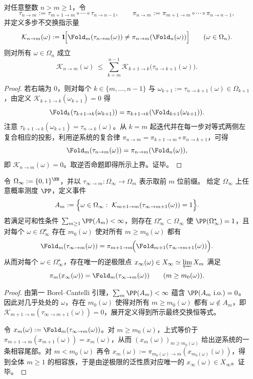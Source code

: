 \begin{lemma}[多步曲率由单步曲率事件支配]\label{lem:pom-multistep-curvature-dominated}
对任意整数 $n>m\ge 1$，令
\[
\tau_{n\to m}:=\tau_{m+1\to m}\circ\cdots\circ\tau_{n\to n-1},
\qquad
\pi_{n\to m}:=\pi_{m+1\to m}\circ\cdots\circ\pi_{n\to n-1},
\]
并定义多步不交换指示量
\[
\mathcal K_{n\to m}(\omega):=\mathbf 1\!\Big[\Fold_m(\tau_{n\to m}(\omega))\neq \pi_{n\to m}(\Fold_n(\omega))\Big]\qquad(\omega\in\Omega_n).
\]
则对所有 $\omega\in\Omega_n$ 成立
\[
\mathcal K_{n\to m}(\omega)\ \le\ \sum_{k=m}^{n-1}\mathcal K_{k+1\to k}\!\bigl(\tau_{n\to k+1}(\omega)\bigr).
\]
\end{lemma}
\begin{proof}
若右端为 $0$，则对每个 $k\in\{m,\dots,n-1\}$ 与 $\omega_{k+1}:=\tau_{n\to k+1}(\omega)\in\Omega_{k+1}$，由定义 $\mathcal K_{k+1\to k}(\omega_{k+1})=0$ 得
\[
\Fold_k(\tau_{k+1\to k}(\omega_{k+1}))=\pi_{k+1\to k}(\Fold_{k+1}(\omega_{k+1})).
\]
注意 $\tau_{k+1\to k}(\omega_{k+1})=\tau_{n\to k}(\omega)$。从 $k=m$ 起迭代并在每一步对等式两侧左复合相应的投影，利用逆系统的复合律 $\pi_{n\to m}=\pi_{k+1\to m}\circ\pi_{n\to k+1}$，可得
\[
\Fold_m(\tau_{n\to m}(\omega))=\pi_{n\to m}(\Fold_n(\omega)),
\]
即 $\mathcal K_{n\to m}(\omega)=0$。取逆否命题即得所示上界。证毕。
\end{proof}

\begin{theorem}[曲率事件可和性推出几乎处处的最终交换]\label{thm:pom-curvature-summable-eventual-commutation}
令 $\Omega_\infty:=\{0,1\}^{\NN}$，并以 $\tau_{\infty\to m}:\Omega_\infty\to\Omega_m$ 表示取前 $m$ 位前缀。
给定 $\Omega_\infty$ 上任意概率测度 $\PP$，定义事件
\[
A_m:=\Bigl\{\omega\in\Omega_\infty:\ \mathcal K_{m+1\to m}(\tau_{\infty\to m+1}(\omega))=1\Bigr\}.
\]
若满足可和性条件 $\sum_{m\ge 1}\PP(A_m)<\infty$，则存在 $\Omega_\infty^\star\subset\Omega_\infty$ 使 $\PP(\Omega_\infty^\star)=1$，且对每个 $\omega\in\Omega_\infty^\star$ 存在 $m_0(\omega)$ 使对所有 $m\ge m_0(\omega)$ 都有
\[
\Fold_m(\tau_{\infty\to m}(\omega))
=\pi_{m+1\to m}\!\Bigl(\Fold_{m+1}(\tau_{\infty\to m+1}(\omega))\Bigr).
\]
从而对每个 $\omega\in\Omega_\infty^\star$，存在唯一的逆极限点 $x_\infty(\omega)\in X_\infty\simeq\varprojlim X_m$ 满足
\[
\pi_m(x_\infty(\omega))=\Fold_m(\tau_{\infty\to m}(\omega))\qquad(m\ge m_0(\omega)).
\]
\end{theorem}
\begin{proof}
由第一 Borel--Cantelli 引理，$\sum_m\PP(A_m)<\infty$ 蕴含 $\PP(A_m\ \mathrm{i.o.})=0$。因此对几乎处处的 $\omega$，存在 $m_0(\omega)$ 使得对所有 $m\ge m_0(\omega)$ 都有 $\omega\notin A_m$，即 $\mathcal K_{m+1\to m}(\tau_{\infty\to m+1}(\omega))=0$，展开定义得到所示最终交换恒等式。

令 $x_m(\omega):=\Fold_m(\tau_{\infty\to m}(\omega))$。对 $m\ge m_0(\omega)$，上式等价于 $\pi_{m+1\to m}(x_{m+1}(\omega))=x_m(\omega)$，从而 $(x_m(\omega))_{m\ge m_0(\omega)}$ 给出逆系统的一条相容尾部。对 $m<m_0(\omega)$ 再令 $x_m(\omega):=\pi_{m_0(\omega)\to m}(x_{m_0(\omega)}(\omega))$，得到全体 $m\ge 1$ 的相容族，于是由逆极限的泛性质对应唯一的 $x_\infty(\omega)\in X_\infty$。证毕。
\end{proof}


